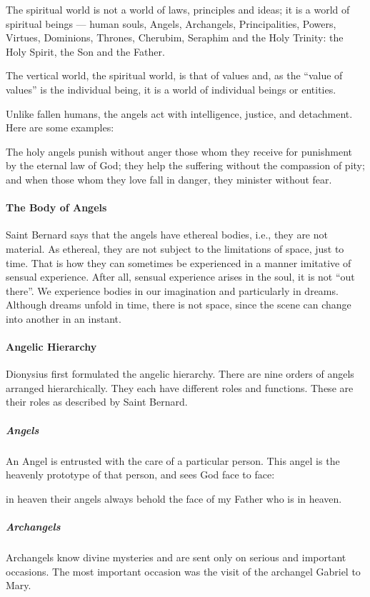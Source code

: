 \begin{quotex}
The spiritual world is not a world of laws, principles and ideas; it is a world of spiritual beings — human souls, Angels, Archangels, Principalities, Powers, Virtues, Dominions, Thrones, Cherubim, Seraphim and the Holy Trinity: the Holy Spirit, the Son and the Father.

The vertical world, the spiritual world, is that of values and, as the “value of values” is the individual being, it is a world of individual beings or entities.

\end{quotex}
Unlike fallen humans, the angels act with intelligence, justice, and detachment. Here are some examples:

\begin{quotex}
The holy angels punish without anger those whom they receive for punishment by the eternal law of God; they help the suffering without the compassion of pity; and when those whom they love fall in danger, they minister without fear. 

\end{quotex}
\paragraph{The Body of Angels}
Saint Bernard says that the angels have ethereal bodies, i.e., they are not material. As ethereal, they are not subject to the limitations of space, just to time. That is how they can sometimes be experienced in a manner imitative of sensual experience. After all, sensual experience arises in the soul, it is not “out there”. We experience bodies in our imagination and particularly in dreams. Although dreams unfold in time, there is not space, since the scene can change into another in an instant.

\paragraph{Angelic Hierarchy}
Dionysius first formulated the angelic hierarchy. There are nine orders of angels arranged hierarchically. They each have different roles and functions. These are their roles as described by Saint Bernard.

\subparagraph{Angels}
An Angel is entrusted with the care of a particular person. This angel is the heavenly prototype of that person, and sees God face to face:

\begin{quotex}
in heaven their angels always behold the face of my Father who is in heaven. 

\end{quotex}
\subparagraph{Archangels}
Archangels know divine mysteries and are sent only on serious and important occasions. The most important occasion was the visit of the archangel Gabriel to Mary.

